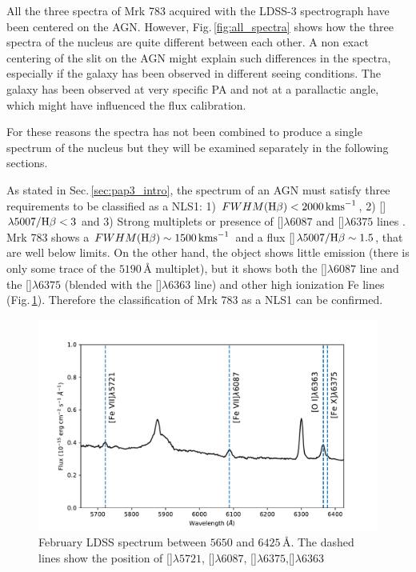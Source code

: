 \documentclass[../main.tex]{subfiles}
\begin{document}
All the three spectra of Mrk 783 acquired with the LDSS-3 spectrograph have been centered on the AGN.
However, Fig.\,\ref{fig:all_spectra} shows how the three spectra of the nucleus are quite different between each other.
A non exact centering of the slit on the AGN might explain such differences in the spectra, especially if the galaxy has been observed in different seeing conditions.
The galaxy has been observed at very specific PA and not at a parallactic angle, which might have influenced the flux calibration.

For these reasons the spectra has not been combined to produce a single spectrum of the nucleus but they will be examined separately in the following sections.

As stated in Sec.\,\ref{sec:pap3_intro}, the spectrum of an AGN must satisfy three requirements to be classified as a NLS1: 1) $FWHM(\Hb)<2000\,\si{\kms}$, 2) []$\lambda5007/\Hb<3$ \citep{Osterbrock85} and 3) Strong  multiplets or presence of []$\lambda6087$ and []$\lambda6375$ lines \citep{Goodrich89}.
Mrk 783 shows a $FWHM(\Hb)\sim1500\,\si{\kms}$ and a flux []$\lambda5007/\Hb\sim 1.5$, that are well below \citet{Osterbrock85} limits.
On the other hand, the object shows little  emission (there is only some trace of the $5190\,\si{\angstrom}$ multiplet), but it shows both the []$\lambda6087$ line and the []$\lambda6375$ (blended with the []$\lambda6363$ line) and other high ionization Fe lines (Fig.\,\ref{fig:fe_lines}).
Therefore the classification of Mrk 783 as a NLS1 can be confirmed.

\begin{figure}
\centering
\includegraphics[width=\textwidth]{images/paper3/Fe_lines.pdf} 
\caption[]{February LDSS spectrum between $5650$ and $6425\,\si{\angstrom}$. The dashed lines show the position of []$\lambda5721$,  []$\lambda6087$, []$\lambda6375$,[]$\lambda6363$} 
\label{fig:fe_lines}
\end{figure} 
\end{document}
